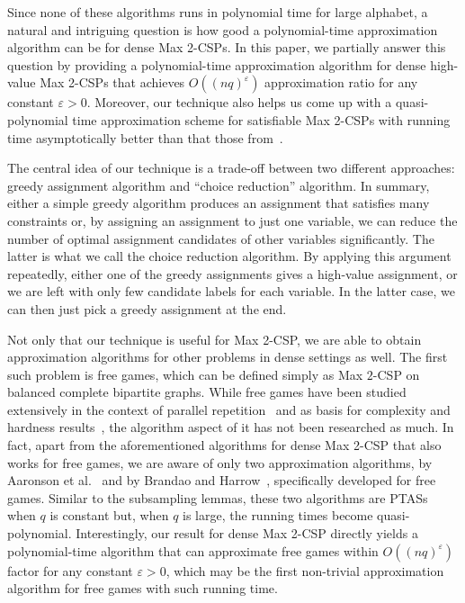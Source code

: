 \documentclass{article}
\begin{document}
Since none of these algorithms runs in polynomial time for large alphabet, a natural and intriguing question is how good a polynomial-time approximation algorithm can be for dense {\sc Max 2-CSP}s. In this paper, we partially answer this question by providing a polynomial-time approximation algorithm for dense high-value {\sc Max 2-CSP}s that achieves $O((nq)^\varepsilon)$ approximation ratio for any constant $\varepsilon > 0$. Moreover, our technique also helps us come up with a quasi-polynomial time approximation scheme for satisfiable {\sc Max 2-CSP}s with running time asymptotically better than that those from~\cite{AIM, Alon:2003:RSA:963875.963877, AKK95, BMHS11}.

The central idea of our technique is a trade-off between two different approaches: greedy assignment algorithm and ``choice reduction'' algorithm. In summary, either a simple greedy algorithm produces an assignment that satisfies many constraints or, by assigning an assignment to just one variable, we can reduce the number of optimal assignment candidates of other variables significantly. The latter is what we call the choice reduction algorithm. By applying this argument repeatedly, either one of the greedy assignments gives a high-value assignment, or we are left with only few candidate labels for each variable. In the latter case, we can then just pick a greedy assignment at the end.

Not only that our technique is useful for {\sc Max 2-CSP}, we are able to obtain approximation algorithms for other problems in dense settings as well. The first such problem is free games, which can be defined simply as {\sc Max $2$-CSP} on balanced complete bipartite graphs. While free games have been studied extensively in the context of parallel repetition~\cite{BRR+09, S13} and as basis for complexity and hardness results~\cite{AIM, BKW15}, the algorithm aspect of it has not been researched as much. In fact, apart from the aforementioned algorithms for dense {\sc Max 2-CSP} that also works for free games, we are aware of only two approximation algorithms, by Aaronson et al.~\cite{AIM} and by Brandao and Harrow~\cite{BH13}, specifically developed for free games. Similar to the subsampling lemmas, these two algorithms are PTASs when $q$ is constant but, when $q$ is large, the running times become quasi-polynomial. Interestingly, our result for dense {\sc Max 2-CSP} directly yields a polynomial-time algorithm that can approximate free games within $O((nq)^\varepsilon)$ factor for any constant $\varepsilon > 0$, which may be the first non-trivial approximation algorithm for free games with such running time.
\end{document}
